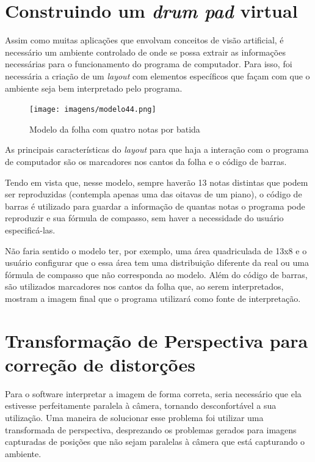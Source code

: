 \documentclass[12pt]{report}
\begin{document}
\section{Construindo um {\it drum pad} virtual}

Assim como muitas aplicações que envolvam conceitos de visão
artificial, é necessário um ambiente controlado de onde se possa
extrair as informações necessárias para o funcionamento do programa de
computador. Para isso, foi necessária a criação de um {\it layout} com
elementos específicos que façam com que o ambiente seja bem
interpretado pelo programa.

\begin{figure}[H]
  \centering
  \texttt{[image: imagens/modelo44.png]}
  \caption{Modelo da folha com quatro notas por batida}
  \label{fig:modelo_}
\end{figure}

As principais características do {\it layout} para que haja a
interação com o programa de computador são os marcadores nos cantos da
folha e o código de barras.

Tendo em vista que, nesse modelo, sempre haverão 13 notas distintas
que podem ser reproduzidas (contempla apenas uma das oitavas de um
piano), o código de barras é utilizado para guardar a informação de
quantas notas o programa pode reproduzir e sua fórmula de compasso,
sem haver a necessidade do usuário especificá-las.

Não faria sentido o modelo ter, por exemplo, uma área quadriculada de
13x8 e o usuário configurar que o essa área tem uma distribuição
diferente da real ou uma fórmula de compasso que não corresponda ao
modelo. Além do código de barras, são utilizados marcadores nos cantos
da folha que, ao serem interpretados, mostram a imagem final que o
programa utilizará como fonte de interpretação.

\section{Transformação de Perspectiva para correção de distorções}
\label{sec:perspectiva}

Para o software interpretar a imagem de forma correta, seria
necessário que ela estivesse perfeitamente paralela à câmera, tornando
desconfortável a sua utilização. Uma maneira de solucionar esse
problema foi utilizar uma transformada de perspectiva, desprezando os
problemas gerados para imagens capturadas de posições que não sejam
paralelas à câmera que está capturando o ambiente.
\end{document}
